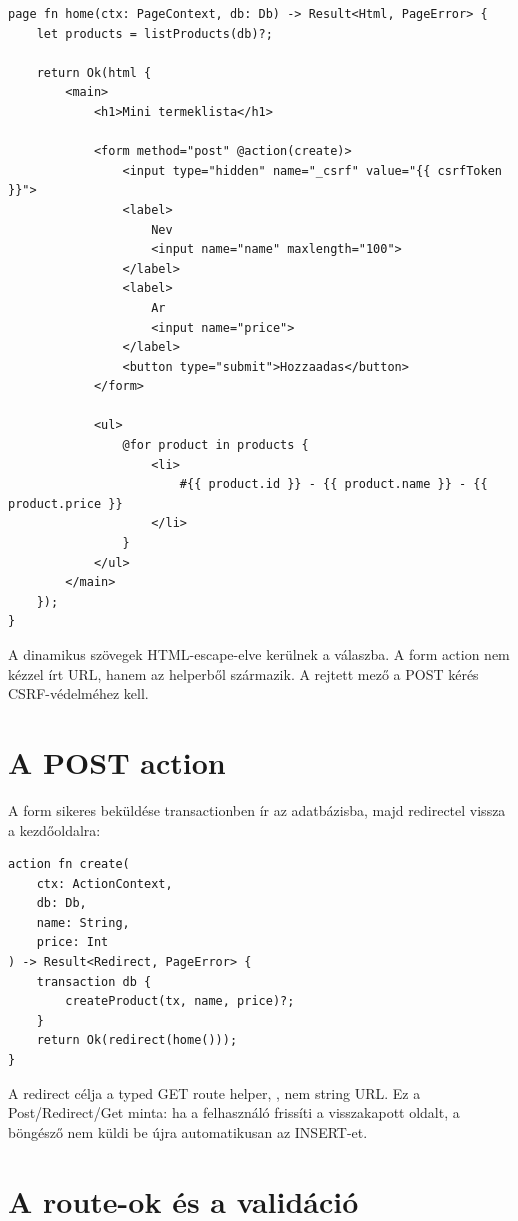 \begin{lstlisting}[language=RWLang]
page fn home(ctx: PageContext, db: Db) -> Result<Html, PageError> {
    let products = listProducts(db)?;

    return Ok(html {
        <main>
            <h1>Mini termeklista</h1>

            <form method="post" @action(create)>
                <input type="hidden" name="_csrf" value="{{ csrfToken }}">
                <label>
                    Nev
                    <input name="name" maxlength="100">
                </label>
                <label>
                    Ar
                    <input name="price">
                </label>
                <button type="submit">Hozzaadas</button>
            </form>

            <ul>
                @for product in products {
                    <li>
                        #{{ product.id }} - {{ product.name }} - {{ product.price }}
                    </li>
                }
            </ul>
        </main>
    });
}
\end{lstlisting}

A dinamikus szövegek HTML-escape-elve kerülnek a válaszba. A form action nem kézzel írt URL, hanem az  helperből származik. A rejtett  mező a POST kérés CSRF-védelméhez kell.

\section{A POST action}

A form sikeres beküldése transactionben ír az adatbázisba, majd redirectel vissza a kezdőoldalra:

\begin{lstlisting}[language=RWLang]
action fn create(
    ctx: ActionContext,
    db: Db,
    name: String,
    price: Int
) -> Result<Redirect, PageError> {
    transaction db {
        createProduct(tx, name, price)?;
    }
    return Ok(redirect(home()));
}
\end{lstlisting}

A redirect célja a typed GET route helper, , nem string URL. Ez a Post/Redirect/Get minta: ha a felhasználó frissíti a visszakapott oldalt, a böngésző nem küldi be újra automatikusan az INSERT-et.

\section{A route-ok és a validáció}

